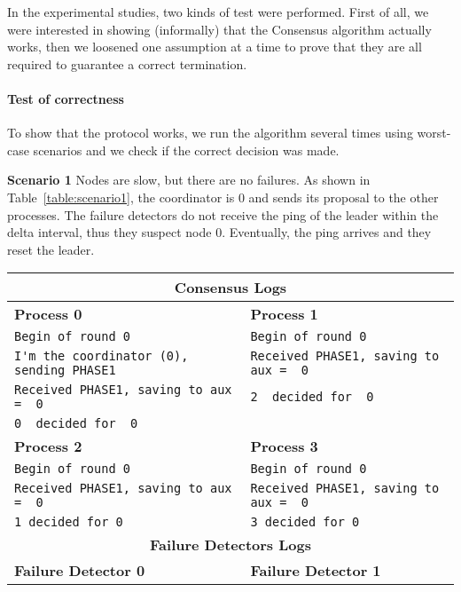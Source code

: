\documentclass[a4paper]{article}
\begin{document}
In the experimental studies, two kinds of test were performed. First of all, we were interested in showing (informally) that the Consensus algorithm actually works, then we loosened one assumption at a time to prove that they are all required to guarantee a correct termination.

\paragraph{Test of correctness} To show that the protocol works, we run the algorithm several times using worst-case scenarios and we check if the correct decision was made.

\begin{compactitem}
\item \textbf{Scenario 1} Nodes are slow, but there are no failures. As shown in Table~\ref{table:scenario1}, the coordinator is $0$ and sends its proposal to the other processes. The failure detectors do not receive the ping of the leader within the delta interval, thus they suspect node $0$. Eventually, the ping arrives and they reset the leader.
	\begin{table}[H]
		\centering\scriptsize
        \begin{tabular}{ll}
		\toprule
        \multicolumn{2}{c}{\textbf{Consensus Logs}} \\
        \midrule
		\textbf{Process 0} & \textbf{Process 1} \\
		\midrule
        \verb|Begin of round 0| & \verb|Begin of round 0| \\
		\verb|I'm the coordinator (0), sending PHASE1| & \verb|Received PHASE1, saving to aux =  0| \\
		\verb|Received PHASE1, saving to aux =  0| & \verb|2  decided for  0| \\
		\verb|0  decided for  0| & \\
        \midrule
		\textbf{Process 2} & \textbf{Process 3} \\
		\midrule
        \verb|Begin of round 0| & \verb|Begin of round 0| \\
		\verb|Received PHASE1, saving to aux =  0| & \verb|Received PHASE1, saving to aux =  0| \\
		\verb|1 decided for 0| & \verb|3 decided for 0| \\
        \bottomrule\toprule
		\multicolumn{2}{c}{\textbf{Failure Detectors Logs}} \\
		\midrule
		\textbf{Failure Detector 0} & \textbf{Failure Detector 1} \\

\end{tabular}
\end{table}
\end{compactitem}
\end{document}
